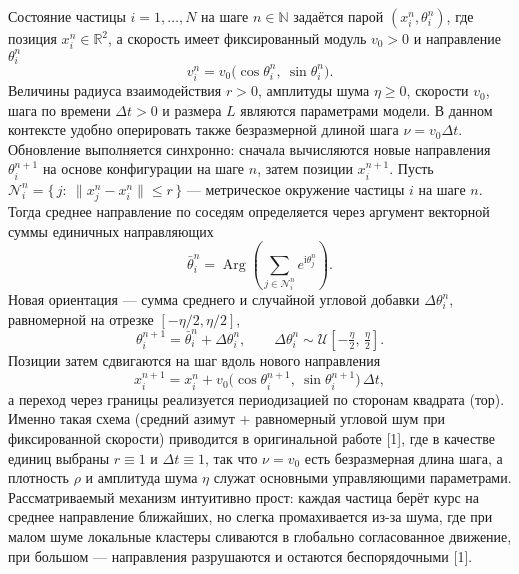 Состояние частицы $i=1,\dots,N$ на шаге $n\in\mathbb N$ задаётся парой $(x_i^n,\theta_i^n)$, где позиция $x_i^n\in\mathbb R^2$, а скорость имеет фиксированный модуль $v_0>0$ и направление $\theta _i^n$
\begin{equation}
    v_i^n=v_0\bigl(\cos \theta _i^n,\ \sin\theta _i^n\bigr).
\end{equation}
Величины радиуса взаимодействия $r>0$, амплитуды шума $\eta\ge 0$, скорости $v_0$, шага по времени $\Delta t>0$ и размера $L$ являются параметрами модели. В данном контексте удобно оперировать также безразмерной длиной шага $\nu=v_0\Delta t$. Обновление выполняется синхронно: сначала вычисляются новые направления $\theta_i^{n+1}$ на основе конфигурации на шаге $n$, затем позиции $x_i^{n+1}$. Пусть $\mathcal N_i^n=\{\,j:\ \|x_j^n-x_i^n\|\le r\,\}$ — метрическое окружение частицы $i$ на шаге $n$. Тогда среднее направление по соседям определяется через аргумент векторной суммы единичных направляющих
\begin{equation}
    \bar\theta _i^n=\operatorname{Arg}\!\left(\sum_{j\in\mathcal N_i^n}e^{\mathrm i\theta _j^n}\right).
\end{equation}
Новая ориентация — сумма среднего и случайной угловой добавки $\Delta\theta_i^n$, равномерной на отрезке $[-\eta/2,\eta/2]$,
\begin{equation}
    \theta _i^{n+1}=\bar\theta _i^n+\Delta\theta _i^n,\qquad \Delta\theta _i^n\sim\mathcal U\!\left[-\tfrac{\eta}{2},\,\tfrac{\eta}{2}\right].
\end{equation}
Позиции затем сдвигаются на шаг вдоль нового направления
\begin{equation}
   x_i^{n+1}=x_i^n+v_0\bigl(\cos\theta _i^{n+1},\ \sin\theta _i^{n+1}\bigr)\,\Delta t, 
\end{equation}
а переход через границы реализуется периодизацией по сторонам квадрата (тор). Именно такая схема (средний азимут + равномерный угловой шум при фиксированной скорости) приводится в оригинальной работе [1], где в качестве единиц выбраны $r\equiv 1$ и $\Delta t\equiv 1$, так что $\nu=v_0$ есть безразмерная длина шага, а плотность $\rho$ и амплитуда шума $\eta$ служат основными управляющими параметрами. Рассматриваемый механизм интуитивно прост: каждая частица берёт курс на среднее направление ближайших, но слегка промахивается из-за шума, где при малом шуме локальные кластеры сливаются в глобально согласованное движение, при большом — направления разрушаются и остаются беспорядочными [1].

